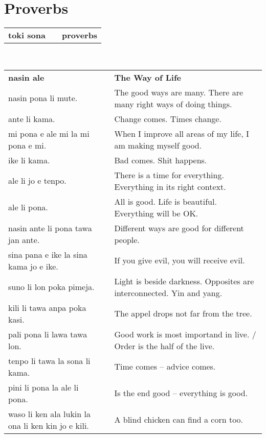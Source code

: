 %
\section{Proverbs}
%
\begin{supertabular}{p{6cm}|ll}
\textbf{toki sona} && \textbf{proverbs} \\
\end{supertabular} \\
%
\begin{supertabular}{p{6cm}|ll}
\textbf{nasin ale} && \textbf{The Way of Life} \\
nasin pona li mute. && The good ways are many. There are many right ways of doing things. \\
ante li kama.  && Change comes. Times change.  \\
mi pona e ale mi la mi pona e mi.  && When I improve all areas of my life, I am making myself good.  \\
ike li kama. && Bad comes. Shit happens.  \\ 
ale li jo e tenpo.  && There is a time for everything. Everything in its right context. \\
ale li pona.  && All is good. Life is beautiful. Everything will be OK.  \\
nasin ante li pona tawa jan ante. && Different ways are good for different people. \\ 
sina pana e ike la sina kama jo e ike. && If you give evil, you will receive evil. \\
suno li lon poka pimeja.  && Light is beside darkness. Opposites are interconnected. Yin and yang. \\
kili li tawa anpa poka kasi. && The appel drops not far from the tree. \\
pali pona li lawa tawa lon. && Good work is most importand in live. / Order is the half of the live. \\
tenpo li tawa la sona li kama. && Time comes -- advice comes. \\
pini li pona la ale li pona. && Is the end good -- everything is good. \\
waso li ken ala lukin la ona li ken kin jo e kili. && A blind chicken can find a corn too. \\
\end{supertabular} \\

